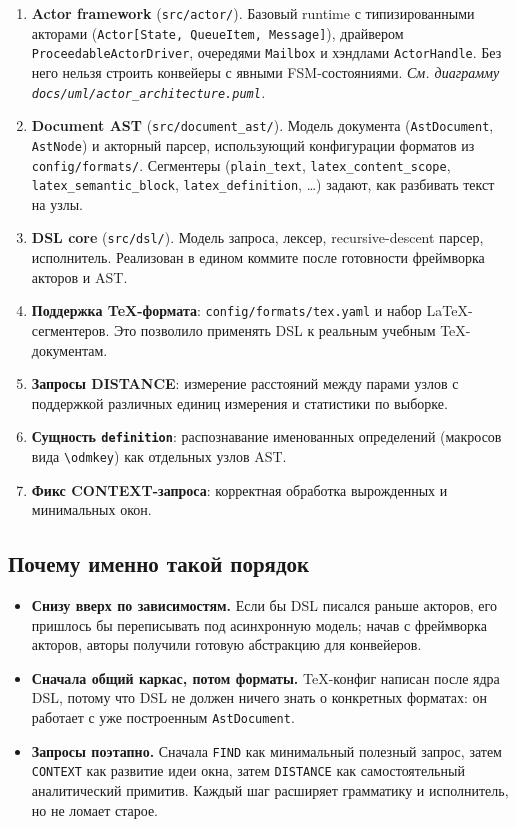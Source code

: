 \documentclass[12pt,a4paper]{article}
\newcommand{\uml}[1]{\textit{См. диаграмму \texttt{docs/uml/#1}.}}
\newcommand{\code}[1]{\texttt{#1}}
\begin{document}
\begin{enumerate}
  \item \textbf{Actor framework} (\code{src/actor/}). Базовый runtime
        с типизированными акторами (\code{Actor[State, QueueItem,
        Message]}), драйвером \code{ProceedableActorDriver}, очередями
        \code{Mailbox} и хэндлами \code{ActorHandle}. Без него нельзя
        строить конвейеры с явными FSM-состояниями.
        \uml{actor\_architecture.puml}
  \item \textbf{Document AST} (\code{src/document\_ast/}). Модель
        документа (\code{AstDocument}, \code{AstNode}) и акторный
        парсер, использующий конфигурации форматов из
        \code{config/formats/}. Сегментеры (\code{plain\_text},
        \code{latex\_content\_scope}, \code{latex\_semantic\_block},
        \code{latex\_definition}, \dots) задают, как разбивать текст
        на узлы.
  \item \textbf{DSL core} (\code{src/dsl/}). Модель запроса, лексер,
        recursive-descent парсер, исполнитель. Реализован в едином
        коммите после готовности фреймворка акторов и AST.
  \item \textbf{Поддержка TeX-формата}: \code{config/formats/tex.yaml}
        и набор LaTeX-сегментеров. Это позволило применять DSL к
        реальным учебным TeX-документам.
  \item \textbf{Запросы DISTANCE}: измерение расстояний между
        парами узлов с поддержкой различных единиц измерения и
        статистики по выборке.
  \item \textbf{Сущность \code{definition}}: распознавание
        именованных определений (макросов вида \code{\textbackslash odmkey})
        как отдельных узлов AST.
  \item \textbf{Фикс CONTEXT-запроса}: корректная обработка
        вырожденных и минимальных окон.
\end{enumerate}

\subsection{Почему именно такой порядок}

\begin{itemize}
  \item \textbf{Снизу вверх по зависимостям.} Если бы DSL писался
        раньше акторов, его пришлось бы переписывать под асинхронную
        модель; начав с фреймворка акторов, авторы получили готовую
        абстракцию для конвейеров.
  \item \textbf{Сначала общий каркас, потом форматы.} TeX-конфиг
        написан после ядра DSL, потому что DSL не должен ничего знать
        о конкретных форматах: он работает с уже построенным
        \code{AstDocument}.
  \item \textbf{Запросы поэтапно.} Сначала \code{FIND} как минимальный
        полезный запрос, затем \code{CONTEXT} как развитие идеи окна,
        затем \code{DISTANCE} как самостоятельный аналитический
        примитив. Каждый шаг расширяет грамматику и исполнитель, но
        не ломает старое.
\end{itemize}
\end{document}
